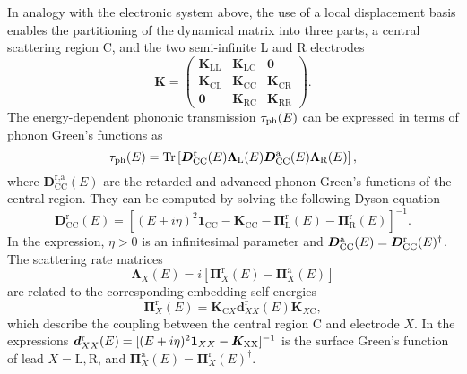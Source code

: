 \documentclass[aps,amsmath,amssymb,twocolumn,showpacs]{revtex4-1}
\begin{document}
In analogy with the electronic system above, the use of a local displacement
basis enables the partitioning of the dynamical matrix into three parts, a
central scattering region C, and the two semi-infinite L and R electrodes
%
\begin{equation}
  \boldsymbol{K}=\left(\begin{array}{ccc}
    \boldsymbol{K}_{\mathrm{LL}} & \boldsymbol{K}_{\mathrm{LC}} & \mathrm{\boldsymbol{0}}\\
    \boldsymbol{K}_{\mathrm{CL}} & \boldsymbol{K}_{\mathrm{CC}} & \boldsymbol{K}_{\mathrm{CR}}\\
    \boldsymbol{0} & \boldsymbol{K}_{\mathrm{RC}} & \boldsymbol{K}_{\mathrm{RR}}
  \end{array}\right). 
\label{eq-Kmatrix}
\end{equation}
%
The energy-dependent phononic transmission $\tau_{\rm ph}(E)$ can be expressed in terms of 
phonon Green's functions as \cite{Mingo2003,Burkle2015}
%
\begin{equation}
\tau_{\rm ph}(E) = \mathrm{Tr} \left[ \boldsymbol{D}_{\mathrm{CC}}^{\textrm{r}}(E) 
 \boldsymbol{\Lambda}_{\textrm{L}}(E) \boldsymbol{D}_{\mathrm{CC}}^{\textrm{a}}(E)
 \boldsymbol{\Lambda}_{\textrm{R}}(E)\right],
\label{eq-tauph}
\end{equation}
%
where $\boldsymbol{D}_{\mathrm{CC}}^{\textrm{r,a}}(E)$ are the retarded and
advanced phonon Green's functions of the central region. They can be computed
by solving the following Dyson equation
%
\begin{equation}
  \boldsymbol{D}_{\mathrm{CC}}^{\mathrm{r}}(E) = \left[\left(E+i\eta
    \right)^{2}\boldsymbol{1}_{\textrm{CC}} - \boldsymbol{K}_{\textrm{CC}} -
    \boldsymbol{\Pi}_{\textrm{L}}^{\mathrm{r}}(E) -
    \boldsymbol{\Pi}_{\textrm{R}}^{\mathrm{r}}(E) \right]^{-1} .
\end{equation}
%
In the expression, $\eta>0$ is an infinitesimal parameter and
$\boldsymbol{D}_{\rm CC}^{\rm a}(E) = \boldsymbol{D}_{\rm CC}^{\rm
  r}(E)^{\dagger}$. The scattering rate matrices
%
\begin{equation}
  \boldsymbol{\Lambda}_{X}(E)= i
  \left[\boldsymbol{\Pi}_{X}^{\mathrm{r}}(E)-\boldsymbol{\Pi}_{X}^{\mathrm{a}}(E)\right]
\end{equation}
%
are related to the corresponding embedding self-energies
%
\begin{equation}
  \boldsymbol{\Pi}_{X}^{\mathrm{r}}(E) = \boldsymbol{K}_{\textrm{C}X} 
  \boldsymbol{d}_{XX}^{\mathrm{r}}(E) \boldsymbol{K}_{X\mathrm{C}},
\end{equation}
%
which describe the coupling between the central region C and electrode $X$. In
the expressions $\boldsymbol{d}_{XX}^{\rm r}(E)= [ (E+i\eta)^{2}\boldsymbol{1}_{XX} - 
\boldsymbol{K}_{\textrm{XX}}]^{-1}$ is the surface Green's function of lead 
$X=\text{L},\text{R}$, and $\boldsymbol{\Pi}_{X}^{\textrm{a}}(E) = 
\boldsymbol{\Pi}_{X}^{\textrm{r}}(E)^{\dagger}$.
\end{document}
